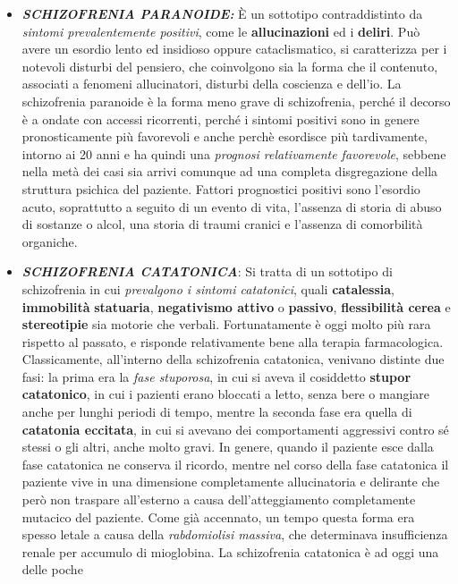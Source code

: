 \documentclass[]{article}
\begin{document}
\begin{itemize}
\item
  \textbf{\emph{SCHIZOFRENIA PARANOIDE:}} È un sottotipo contraddistinto
  da \emph{sintomi prevalentemente positivi}, come le
  \textbf{allucinazioni} ed i \textbf{deliri}. Può avere un esordio
  lento ed insidioso oppure cataclismatico, si caratterizza per i
  notevoli disturbi del pensiero, che coinvolgono sia la forma che il
  contenuto, associati a fenomeni allucinatori, disturbi della coscienza
  e dell'io. La schizofrenia paranoide è la forma meno grave di
  schizofrenia, perché il decorso è a ondate con accessi ricorrenti,
  perché i sintomi positivi sono in genere pronosticamente più
  favorevoli e anche perchè esordisce più tardivamente, intorno ai 20
  anni e ha quindi una \emph{prognosi relativamente favorevole}, sebbene
  nella metà dei casi sia arrivi comunque ad una completa disgregazione
  della struttura psichica del paziente. Fattori prognostici positivi
  sono l'esordio acuto, soprattutto a seguito di un evento di vita,
  l'assenza di storia di abuso di sostanze o alcol, una storia di traumi
  cranici e l'assenza di comorbilità organiche.
\item
  \textbf{\emph{SCHIZOFRENIA CATATONICA}}: Si tratta di un sottotipo di
  schizofrenia in cui \emph{prevalgono i sintomi catatonici}, quali
  \textbf{catalessia}, \textbf{immobilità} \textbf{statuaria},
  \textbf{negativismo attivo} o \textbf{passivo}, \textbf{flessibilità
  cerea} e \textbf{stereotipie} sia motorie che verbali. Fortunatamente
  è oggi molto più rara rispetto al passato, e risponde relativamente
  bene alla terapia farmacologica. Classicamente, all'interno della
  schizofrenia catatonica, venivano distinte due fasi: la prima era la
  \emph{fase stuporosa}, in cui si aveva il cosiddetto \textbf{stupor
  catatonico}, in cui i pazienti erano bloccati a letto, senza bere o
  mangiare anche per lunghi periodi di tempo, mentre la seconda fase era
  quella di \textbf{catatonia eccitata}, in cui si avevano dei
  comportamenti aggressivi contro sé stessi o gli altri, anche molto
  gravi. In genere, quando il paziente esce dalla fase catatonica ne
  conserva il ricordo, mentre nel corso della fase catatonica il
  paziente vive in una dimensione completamente allucinatoria e
  delirante che però non traspare all'esterno a causa dell'atteggiamento
  completamente mutacico del paziente. Come già accennato, un tempo
  questa forma era spesso letale a causa della \emph{rabdomiolisi
  massiva}, che determinava insufficienza renale per accumulo di
  mioglobina. La schizofrenia catatonica è ad oggi una delle poche

\end{itemize}
\end{document}
